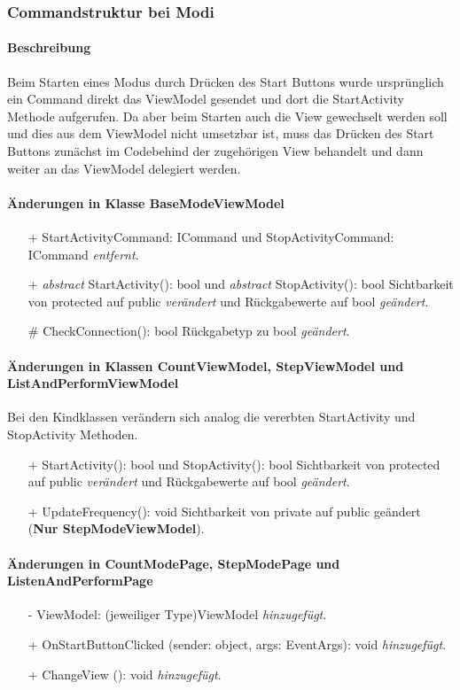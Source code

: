 \documentclass[a4paper,12pt]{article}
\begin{document}
\subsubsection{Commandstruktur bei Modi}
\paragraph{Beschreibung}
Beim Starten eines Modus durch Drücken des Start Buttons wurde ursprünglich ein Command direkt das ViewModel gesendet und dort die StartActivity Methode aufgerufen. Da aber beim Starten auch die View gewechselt werden soll und dies aus dem ViewModel nicht umsetzbar ist, muss das Drücken des Start Buttons zunächst im Codebehind der zugehörigen View behandelt und dann weiter an das ViewModel delegiert werden. 
\paragraph{Änderungen in Klasse BaseModeViewModel}
\begin{itemize}
	\item[+] StartActivityCommand: ICommand und StopActivityCommand: ICommand \textit{entfernt}.
	\item[+] \textit{abstract} StartActivity(): bool und \textit{abstract} StopActivity(): bool Sichtbarkeit von protected auf public \textit{verändert} und Rückgabewerte auf bool \textit{geändert}.
	\item[\#] CheckConnection(): bool Rückgabetyp zu bool \textit{geändert}.
\end{itemize}
\paragraph{Änderungen in Klassen CountViewModel, StepViewModel und ListAndPerformViewModel}
Bei den Kindklassen verändern sich analog die vererbten StartActivity und StopActivity Methoden.
\begin{itemize}
	\item[+] StartActivity(): bool und StopActivity(): bool Sichtbarkeit von protected auf public \textit{verändert} und Rückgabewerte auf bool \textit{geändert}.
	\item[+] UpdateFrequency(): void Sichtbarkeit von private auf public geändert (\textbf{Nur StepModeViewModel}). 
\end{itemize}
\paragraph{Änderungen in CountModePage, StepModePage und ListenAndPerformPage}
\begin{itemize}
	\item[-] ViewModel: (jeweiliger Type)ViewModel \textit{hinzugefügt}.
	\item[+] OnStartButtonClicked (sender: object, args: EventArgs): void \textit{hinzugefügt}.
	\item[+] ChangeView (): void \textit{hinzugefügt}.
\end{itemize}
\end{document}
